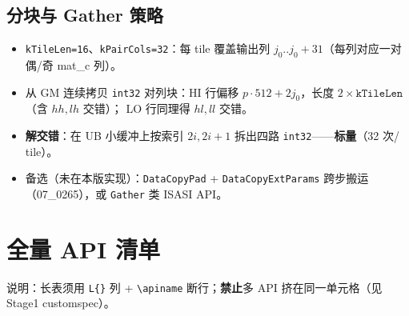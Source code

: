 \documentclass[UTF8,a4paper,11pt]{ctexart}
\begin{document}
\subsection{分块与 Gather 策略}
\begin{itemize}
  \item \texttt{kTileLen=16}、\texttt{kPairCols=32}：每 tile 覆盖输出列 $j_0..j_0+31$（每列对应一对偶/奇 mat\_c 列）。
  \item 从 GM 连续拷贝 \texttt{int32} 对列块：HI 行偏移 $p\cdot 512 + 2j_0$，长度 $2\times\texttt{kTileLen}$（含 $hh,lh$ 交错）；
    LO 行同理得 $hl,ll$ 交错。
  \item \textbf{解交错}：在 UB 小缓冲上按索引 $2i,2i+1$ 拆出四路 \texttt{int32}——\textbf{标量}（32 次/ tile）。
  \item 备选（未在本版实现）：\texttt{DataCopyPad} + \texttt{DataCopyExtParams} 跨步搬运（07\_0265），或 \texttt{Gather} 类 ISASI API。
\end{itemize}

\section{全量 API 清单}
\label{sec:api-table}

说明：长表须用 \texttt{L\{\}} 列 + \texttt{\textbackslash apiname} 断行；\textbf{禁止}多 API 挤在同一单元格（见 Stage1 customspec）。
\end{document}
